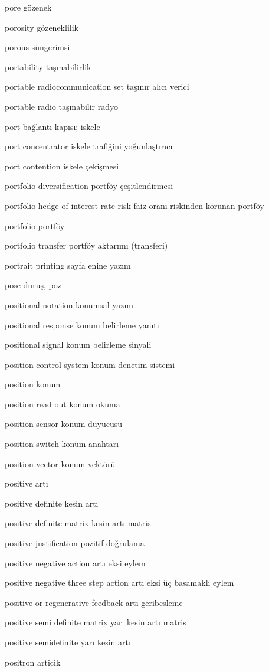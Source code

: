\documentclass[12pt,fleqn]{article}\usepackage{../../common}
\begin{document}
pore gözenek

porosity gözeneklilik

porous süngerimsi

portability taşınabilirlik

portable radiocommunication set taşınır alıcı verici

portable radio taşınabilir radyo

port bağlantı kapısı; iskele

port concentrator iskele trafiğini yoğunlaştırıcı

port contention iskele çekişmesi

portfolio diversification  portföy çeşitlendirmesi

portfolio hedge of interest rate risk faiz oranı riskinden korunan portföy

portfolio portföy

portfolio transfer portföy aktarımı (transferi)

portrait printing sayfa enine yazım

pose duruş, poz

positional notation konumsal yazım

positional response konum belirleme yanıtı

positional signal konum belirleme sinyali

position control system konum denetim sistemi

position konum

position read out konum okuma

position sensor konum duyucusu

position switch konum anahtarı

position vector konum vektörü

positive artı

positive definite kesin artı

positive definite matrix kesin artı matris

positive justification pozitif doğrulama

positive negative action artı eksi eylem

positive negative three step action artı eksi üç basamaklı eylem

positive or regenerative feedback artı geribesleme

positive semi definite matrix yarı kesin artı matris

positive semidefinite yarı kesin artı

positron articik
\end{document}

